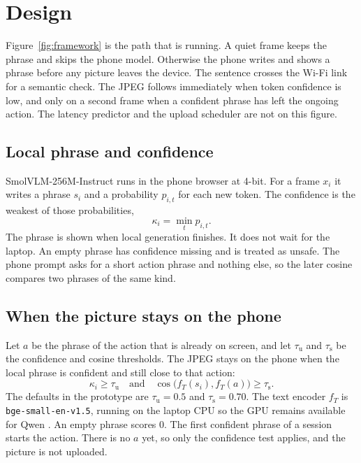 \section{Design}
\label{sec:design}

Figure~\ref{fig:framework} is the path that is running. A quiet frame keeps
the phrase and skips the phone model. Otherwise the phone writes and shows
a phrase before any picture leaves the device. The sentence crosses the
Wi-Fi link for a semantic check. The JPEG follows immediately when token
confidence is low, and only on a second frame when a confident phrase has
left the ongoing action. The latency predictor and the upload scheduler
are not on this figure.

\subsection{Local phrase and confidence}

SmolVLM-256M-Instruct runs in the phone browser at 4-bit. For a frame
$x_i$ it writes a phrase $s_i$ and a probability $p_{i,t}$ for each new
token. The confidence is the weakest of those probabilities,
\begin{equation}
\label{eq:kappa}
\kappa_i = \min_t p_{i,t}.
\end{equation}
The phrase is shown when local generation finishes. It does not wait for
the laptop. An empty phrase has confidence missing and is treated as
unsafe. The phone prompt asks for a short action phrase and nothing else,
so the later cosine compares two phrases of the same kind.

\subsection{When the picture stays on the phone}

Let $a$ be the phrase of the action that is already on screen, and let
$\tau_{\mathrm{u}}$ and $\tau_{\mathrm{s}}$ be the confidence and cosine
thresholds. The JPEG stays on the phone when the local phrase is confident
and still close to that action:
\begin{equation}
\label{eq:keep}
\kappa_i \ge \tau_{\mathrm{u}}
\quad\text{and}\quad
\cos\big(f_T(s_i), f_T(a)\big) \ge \tau_{\mathrm{s}}.
\end{equation}
The defaults in the prototype are $\tau_{\mathrm{u}}=0.5$ and
$\tau_{\mathrm{s}}=0.70$. The text encoder $f_T$ is
\texttt{bge-small-en-v1.5}, running on the laptop CPU so the GPU remains
available for Qwen \cite{xiao2024cpack}. An empty phrase scores 0. The
first confident phrase of a session starts the action. There is no $a$ yet,
so only the confidence test applies, and the picture is not uploaded.

